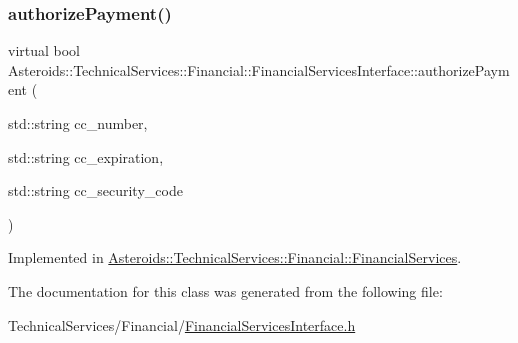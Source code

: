 \subsubsection{\texorpdfstring{authorize\+Payment()}{authorizePayment()}}
{\footnotesize\ttfamily virtual bool Asteroids\+::\+Technical\+Services\+::\+Financial\+::\+Financial\+Services\+Interface\+::authorize\+Payment (\begin{DoxyParamCaption}\item[{std\+::string}]{cc\+\_\+number,  }\item[{std\+::string}]{cc\+\_\+expiration,  }\item[{std\+::string}]{cc\+\_\+security\+\_\+code }\end{DoxyParamCaption})\hspace{0.3cm}{\ttfamily [pure virtual]}}



Implemented in \hyperlink{classAsteroids_1_1TechnicalServices_1_1Financial_1_1FinancialServices_ac4f78b0a1383b8d13d2c86b8eff8c193}{Asteroids\+::\+Technical\+Services\+::\+Financial\+::\+Financial\+Services}.



The documentation for this class was generated from the following file\+:\begin{DoxyCompactItemize}
\item 
Technical\+Services/\+Financial/\hyperlink{FinancialServicesInterface_8h}{Financial\+Services\+Interface.\+h}\end{DoxyCompactItemize}
